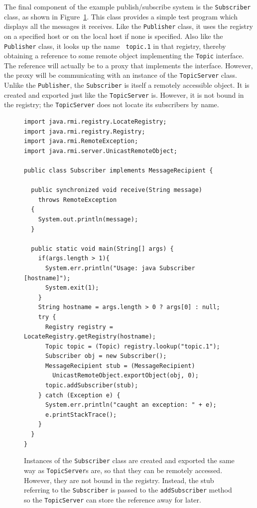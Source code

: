The final component of the example publish/subscribe system is the
{\tt Subscriber} class, as shown in Figure~\ref{Subscriber-source}.
This class provides a simple test program which displays all the
messages it receives.  Like the {\tt Publisher} class, it uses the
registry on a specified host or on the local host if none is specified.
Also like the {\tt Publisher} class, it looks up the name {\tt
  topic.1} in that registry, thereby obtaining a reference to some
remote object implementing the {\tt Topic} interface.  
The reference will actually be to
a proxy that implements the interface.  However, the
proxy will be communicating with an instance of the {\tt TopicServer}
class.  Unlike the {\tt Publisher}, the {\tt Subscriber} is itself a
remotely accessible object.  It is created and exported just like the
{\tt TopicServer} is.  However, it is not bound in the registry; the
{\tt TopicServer} does not locate its subscribers by name.
\begin{figure}
\begin{verbatim}
import java.rmi.registry.LocateRegistry;
import java.rmi.registry.Registry;
import java.rmi.RemoteException;
import java.rmi.server.UnicastRemoteObject;

public class Subscriber implements MessageRecipient {

  public synchronized void receive(String message)
    throws RemoteException
  {
    System.out.println(message);
  }

  public static void main(String[] args) {
    if(args.length > 1){
      System.err.println("Usage: java Subscriber [hostname]");
      System.exit(1);
    }
    String hostname = args.length > 0 ? args[0] : null;
    try {
      Registry registry = LocateRegistry.getRegistry(hostname);
      Topic topic = (Topic) registry.lookup("topic.1");
      Subscriber obj = new Subscriber();
      MessageRecipient stub = (MessageRecipient)
        UnicastRemoteObject.exportObject(obj, 0);
      topic.addSubscriber(stub);
    } catch (Exception e) {
      System.err.println("caught an exception: " + e);
      e.printStackTrace();
    }
  }
}
\end{verbatim}
\caption{Instances of the {\tt Subscriber} class are created and
  exported the same way as {\tt TopicServer}s are, so that they can be
  remotely accessed.  However, they are not bound in the registry.
  Instead, the stub referring to the {\tt Subscriber} is passed to the {\tt addSubscriber}
  method so the {\tt TopicServer} can store the reference away for later.}\label{Subscriber-source}
\end{figure}

